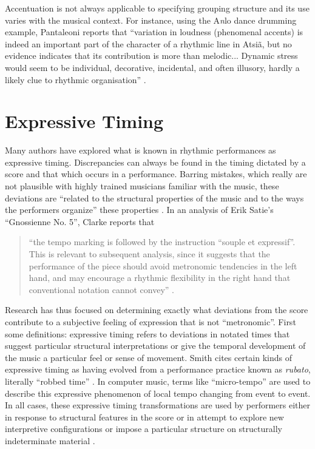 Accentuation is not always applicable to specifying grouping structure
and its use varies with the musical context. For instance, using the 
A{\it n}lo dance drumming example, Pantaleoni reports that ``variation
in loudness (phenomenal accents) is indeed an important part of the 
character of a rhythmic line in Atsi{\~ a}, but no evidence indicates 
that its contribution is more than melodic... Dynamic stress would
seem to be individual, decorative, incidental, and often illusory, 
hardly a likely clue to rhythmic organisation'' \cite[pp. 54]{Pantaleoni:72}.

\vspace{7mm}
\section{Expressive Timing}
\vspace{3mm}

Many authors have explored what is known in rhythmic performances as
expressive timing. Discrepancies can always be found in the timing
dictated by a score and that which occurs in a performance. Barring
mistakes, which really are not plausible with highly trained musicians
familiar with the music, these deviations are ``related to the
structural properties of the music and to the ways the performers
organize'' these properties \cite{Clarke:85structure}. In an analysis 
of Erik Satie's ``Gnossienne No. 5'', Clarke reports that 
\begin{quote} ``the tempo marking is followed by the instruction ``souple et
expressif''. This is relevant to subsequent analysis, since it
suggests that the performance of the piece should avoid metronomic
tendencies in the left hand, and may encourage a rhythmic flexibility
in the right hand that conventional notation cannot convey'' \cite[p. 300]{Clarke:85}.
\end{quote}

Research has thus focused on determining exactly what deviations from 
the score contribute to a subjective feeling of expression that is 
not ``metronomic''. First some definitions: expressive timing refers 
to deviations in notated times that suggest particular structural 
interpretations or give the temporal development of the music a 
particular feel or sense of movement. Smith cites certain kinds
of expressive timing as having evolved from a performance practice 
known as {\it rubato}, literally ``robbed time''
\cite[pp. 37]{Smith:99}. In computer music, terms like ``micro-tempo''
are used to describe this expressive phenomenon of local tempo
changing from event to event. In all cases,
these expressive timing transformations are used by performers either 
in response to structural features in the score or in attempt to
explore new interpretive configurations  or impose a particular
structure on structurally indeterminate material \cite{Clarke:85structure}.

